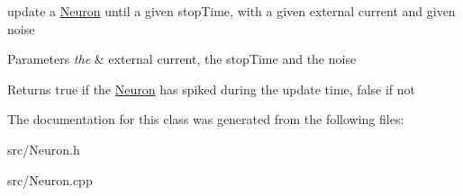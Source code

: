 update a \hyperlink{classNeuron}{Neuron} until a given stop\+Time, with a given external current and given noise 


\begin{DoxyParams}{Parameters}
{\em the} & external current, the stop\+Time and the noise \\
\hline
\end{DoxyParams}
\begin{DoxyReturn}{Returns}
true if the \hyperlink{classNeuron}{Neuron} has spiked during the update time, false if not 
\end{DoxyReturn}


The documentation for this class was generated from the following files\+:\begin{DoxyCompactItemize}
\item 
src/Neuron.\+h\item 
src/Neuron.\+cpp\end{DoxyCompactItemize}
